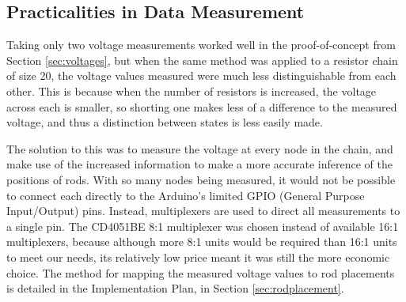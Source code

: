 
\subsection{Practicalities in Data Measurement}
Taking only two voltage measurements worked well in the proof-of-concept from Section \ref{sec:voltages}, but when the same method was applied to a resistor chain of size 20, the voltage values measured were much less distinguishable from each other. This is because when the number of resistors is increased, the voltage across each is smaller, so shorting one makes less of a difference to the measured voltage, and thus a distinction between states is less easily made.

The solution to this was to measure the voltage at every node in the chain, and make use of the increased information to make a more accurate inference of the positions of rods. With so many nodes being measured, it would not be possible to connect each directly to the Arduino's limited GPIO (General Purpose Input/Output) pins. Instead, multiplexers are used to direct all measurements to a single pin. The CD4051BE 8:1 multiplexer \cite{CD4051BE27:online} was chosen instead of available 16:1 multiplexers, because although more 8:1 units would be required than 16:1 units to meet our needs, its relatively low price meant it was still the more economic choice. The method for mapping the measured voltage values to rod placements is detailed in the Implementation Plan, in Section \ref{sec:rodplacement}.



